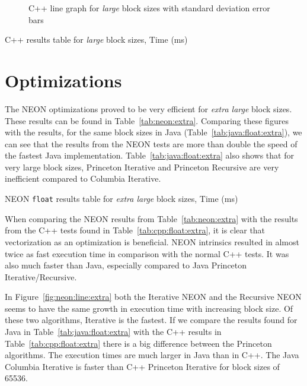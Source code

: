 \begin{figure}
    \centering
    
    \caption{C++ line graph for \emph{large} block sizes with standard deviation error bars}
    \label{fig:cpp:line:large}
\end{figure}
\begin{table}
    \centering
    \caption{C++ results table for \emph{large} block sizes, Time (ms)}
    \label{tab:cpp:large}
    \resizebox{\columnwidth}{!}{
        
    }
\end{table}

\section{Optimizations}
The NEON optimizations proved to be very efficient for \emph{extra large} block sizes. These results can be found in Table~\ref{tab:neon:extra}. Comparing these figures with the results, for the same block sizes in Java (Table~\ref{tab:java:float:extra}), we can see that the results from the NEON tests are more than double the speed of the fastest Java implementation. Table~\ref{tab:java:float:extra} also shows that for very large block sizes, Princeton Iterative and Princeton Recursive are very inefficient compared to Columbia Iterative.

\begin{table}
    \centering
    \caption{NEON \texttt{float} results table for \emph{extra large} block sizes, Time (ms)}
    \label{tab:neon:extra}
    
\end{table}

When comparing the NEON results from Table~\ref{tab:neon:extra} with the results from the C++ tests found in Table~\ref{tab:cpp:float:extra}, it is clear that vectorization as an optimization is beneficial. NEON intrinsics resulted in almost twice as fast execution time in comparison with the normal C++ tests. It was also much faster than Java, especially compared to Java Princeton Iterative/Recursive.

In Figure~\ref{fig:neon:line:extra} both the Iterative NEON and the Recursive NEON seems to have the same growth in execution time with increasing block size. Of these two algorithms, Iterative is the fastest. If we compare the results found for Java in Table~\ref{tab:java:float:extra} with the C++ results in Table~\ref{tab:cpp:float:extra} there is a big difference between the Princeton algorithms. The execution times are much larger in Java than in C++. The Java Columbia Iterative is faster than C++ Princeton Iterative for block sizes of 65536.

